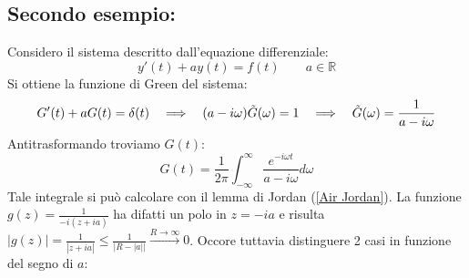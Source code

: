 \documentclass[twoside]{article}
\begin{document}
\subsection{Secondo esempio:}
Considero il sistema descritto dall'equazione differenziale:
\begin{equation}
    y'(t)+ay(t)=f(t) \qquad a\in\mathds{R}
\end{equation}
Si ottiene la funzione di Green del sistema:
\begin{equation}
    G'(t)+aG(t)=\delta(t)\quad \Longrightarrow\quad (a-i\omega)\Tilde{G}(\omega)=1 \quad \Longrightarrow\quad \Tilde{G}(\omega)=\frac{1}{a-i\omega}
\end{equation}
Antitrasformando troviamo $G(t)$:
\begin{equation}
    G(t)=\frac{1}{2\pi}\int_{-\infty}^\infty \frac{e^{-i\omega t}}{a-i\omega}d\omega
\end{equation}
Tale integrale si può calcolare con il lemma di Jordan (\ref{Air Jordan}). La funzione $g(z)=\frac{1}{-i(z+ia)}$ ha difatti un polo in $z=-ia$ e risulta $|g(z)|=\frac{1}{|z+ia|}\le\frac{1}{|R-|a||}\xrightarrow{R\to\infty} 0$.
Occore tuttavia distinguere 2 casi in funzione del segno di $a$:
\end{document}
